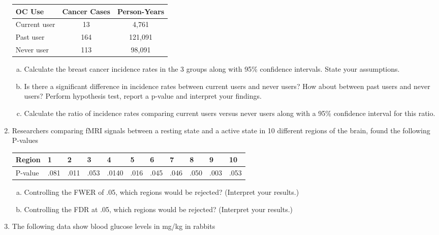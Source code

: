 \documentclass[12pt]{article}
\begin{document}
\begin{enumerate}[Problem 1.]
\begin{center}
\tabcolsep=0.25in
\begin{tabular}{lcc}
OC Use & Cancer Cases & Person-Years \vspace{+0.15in} \\ \hline
Current user & 13 & 4,761 \vspace{+0.15in} \\
Past user & 164 & 121,091 \vspace{+0.15in} \\
Never user & 113 & 98,091 \vspace{+0.15in} \\ \hline
\end{tabular}
\end{center}
\begin{enumerate}[a.]
\item Calculate the breast cancer incidence rates in the 3 groups
  along with 95\% confidence intervals. State your assumptions.
\item Is there a significant difference in incidence rates between
  current users and never users?  How about between past users and
  never users?  Perform hypothesis test, report a p-value and
  interpret your findings.
\item Calculate the ratio of incidence rates comparing current users
  versus never users along with a 95\% confidence interval for this
  ratio.
\end{enumerate}
\item Researchers comparing fMRI signals between a resting state and a active state
  in 10 different regions of the brain, found the following P-values
\begin{center}
  \begin{tabular}{lllllllllll}
Region  & 1 & 2 & 3 & 4 & 5 & 6 & 7 & 8 & 9 & 10 \\ \hline
P-value & .081 & .011 & .053 & .0140 & .016 & .045 &
          .046 & .050 & .003 & .053 \\ \hline
  \end{tabular}
\end{center}
\begin{enumerate}[a.]
\item Controlling the FWER of .05, which regions would be rejected? (Interpret your results.)
\item Controlling the FDR at .05, which regions would be rejected? (Interpret your results.)
\end{enumerate}
\item The following data show blood glucose levels in mg/kg in rabbits 

\end{enumerate}
\end{document}
